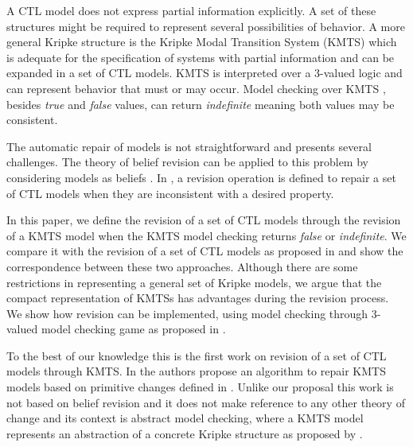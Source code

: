 \documentclass{llncs}
\begin{document}
A CTL model does not express partial information explicitly. A set of these structures might be required to represent several possibilities of behavior. A more general Kripke structure is the Kripke Modal Transition System (KMTS) which is adequate for the specification of systems with partial information \cite{Hut02} and can be expanded in a set of CTL models. KMTS is interpreted over a 3-valued logic and can represent behavior that must or may occur. Model checking over KMTS \cite{Hut02}, besides \textit{true} and \textit{false} values, can return \textit{indefinite} meaning both values may be consistent. 

The automatic repair of models is not straightforward and presents several challenges. The theory of belief revision \cite{AGM85} can be applied to this problem by considering models as beliefs \cite{GW10,Pau10}. In \cite{GW10}, a revision operation is defined to repair a set of CTL models when they are inconsistent with a desired property. 

In this paper, we define the revision of a set of CTL models through the revision of a KMTS model when the KMTS model checking returns \textit{false} or \textit{indefinite}. We compare it with the revision of a set of CTL models as proposed in \cite{Pau10} and show the correspondence between these two approaches. Although there are some restrictions in representing a general set of Kripke models, we argue that the compact representation of KMTSs has advantages during the revision process. We show how revision can be implemented, using model checking through 3-valued model checking game as proposed in \cite{Gru11}.
 
To the best of our knowledge this is the first work on revision of a set of CTL models through KMTS. In \cite{CBSK12} the authors propose an algorithm to repair KMTS models based on primitive changes defined in \cite{ZD08}. Unlike our proposal this work is not based on belief revision and it does not make reference to any other theory of change and its context is abstract model checking, where a KMTS model represents an abstraction of a concrete Kripke structure as proposed by \cite{Gru11}. 

\end{document}
